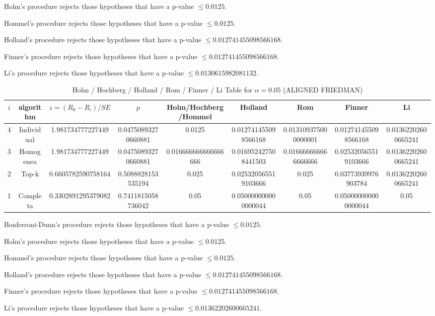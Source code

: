 \documentclass[a4paper,10pt]{article}
\begin{document}
\begin{landscape}
Holm's procedure rejects those hypotheses that have a p-value $\le0.0125$.


Hommel's procedure rejects those hypotheses that have a p-value $\le0.0125$.


Holland's procedure rejects those hypotheses that have a p-value $\le0.012741455098566168$.


Finner's procedure rejects those hypotheses that have a p-value $\le0.012741455098566168$.


Li's procedure rejects those hypotheses that have a p-value $\le0.0130615982081132$.



\newpage

\begin{table}[!htp]
\centering\scriptsize
\caption{Holm / Hochberg / Holland / Rom / Finner / Li Table for $\alpha=0.05$ (ALIGNED FRIEDMAN)}
\begin{tabular}{ccccccccc}
$i$&algorithm&$z=(R_0 - R_i)/SE$&$p$&Holm/Hochberg/Hommel&Holland&Rom&Finner&Li\\
\hline
4&Individual&1.981734777227449&0.04750893270660881&0.0125&0.012741455098566168&0.013109375000000001&0.012741455098566168&0.01362202600665241\\
3&Homogenea&1.981734777227449&0.04750893270660881&0.016666666666666666&0.016952427508441503&0.016666666666666666&0.025320565519103666&0.01362202600665241\\
2&Top-k&0.6605782590758164&0.5088828153535194&0.025&0.025320565519103666&0.025&0.03773939976903784&0.01362202600665241\\
1&Completa&0.3302891295379082&0.7411815058736042&0.05&0.050000000000000044&0.05&0.050000000000000044&0.05\\
\hline
\end{tabular}
\end{table}
Bonferroni-Dunn's procedure rejects those hypotheses that have a p-value $\le0.0125$.


Holm's procedure rejects those hypotheses that have a p-value $\le0.0125$.


Hommel's procedure rejects those hypotheses that have a p-value $\le0.0125$.


Holland's procedure rejects those hypotheses that have a p-value $\le0.012741455098566168$.


Finner's procedure rejects those hypotheses that have a p-value $\le0.012741455098566168$.


Li's procedure rejects those hypotheses that have a p-value $\le0.01362202600665241$.




\end{landscape}
\end{document}
